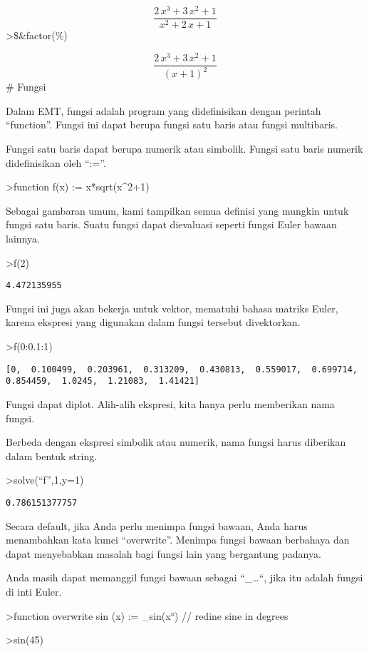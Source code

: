\documentclass[
]{book}
\begin{document}
\[\frac{2\,x^3+3\,x^2+1}{x^2+2\,x+1}\]\textgreater\$\&factor(\%)

\[\frac{2\,x^3+3\,x^2+1}{\left(x+1\right)^2}\]\# Fungsi

Dalam EMT, fungsi adalah program yang didefinisikan dengan perintah ``function''. Fungsi ini dapat berupa fungsi satu baris atau fungsi multibaris.

Fungsi satu baris dapat berupa numerik atau simbolik. Fungsi satu baris numerik didefinisikan oleh ``:=''.

\textgreater function f(x) := x*sqrt(x\^{}2+1)

Sebagai gambaran umum, kami tampilkan semua definisi yang mungkin untuk fungsi satu baris. Suatu fungsi dapat dievaluasi seperti fungsi Euler bawaan lainnya.

\textgreater f(2)

\begin{verbatim}
4.472135955
\end{verbatim}

Fungsi ini juga akan bekerja untuk vektor, mematuhi bahasa matriks Euler, karena ekspresi yang digunakan dalam fungsi tersebut divektorkan.

\textgreater f(0:0.1:1)

\begin{verbatim}
[0,  0.100499,  0.203961,  0.313209,  0.430813,  0.559017,  0.699714,
0.854459,  1.0245,  1.21083,  1.41421]
\end{verbatim}

Fungsi dapat diplot. Alih-alih ekspresi, kita hanya perlu memberikan nama fungsi.

Berbeda dengan ekspresi simbolik atau numerik, nama fungsi harus diberikan dalam bentuk string.

\textgreater solve(``f'',1,y=1)

\begin{verbatim}
0.786151377757
\end{verbatim}

Secara default, jika Anda perlu menimpa fungsi bawaan, Anda harus menambahkan kata kunci ``overwrite''. Menimpa fungsi bawaan berbahaya dan dapat menyebabkan masalah bagi fungsi lain yang bergantung padanya.

Anda masih dapat memanggil fungsi bawaan sebagai ``\_\ldots``, jika itu adalah fungsi di inti Euler.

\textgreater function overwrite sin (x) := \_sin(x°) // redine sine in degrees

\textgreater sin(45)
\end{document}
